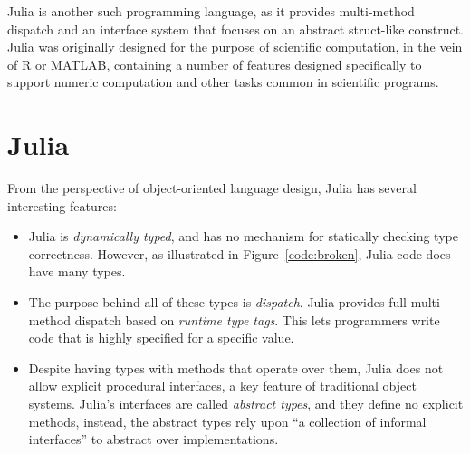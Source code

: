 \documentclass[preprint]{sigplanconf}
\begin{document}
Julia is another such programming language, as it provides multi-method dispatch 
and an interface system that focuses on an abstract struct-like construct. 
Julia was originally designed for the purpose of scientific computation, in the vein of 
R or MATLAB\cite{bezan}, containing a number of features designed specifically to support 
numeric computation and other tasks common in scientific programs.


\section{Julia}

From the perspective of object-oriented language design, Julia has several 
interesting features:
\begin{itemize}
\item Julia is \emph{dynamically typed}, and has no mechanism for statically
checking type correctness. However, as illustrated in Figure~\ref{code:broken},
Julia code does have many types.
\item The purpose behind all of these types is \emph{dispatch}. Julia provides 
full multi-method dispatch based on \emph{runtime type tags}. This lets programmers
write code that is highly specified for a specific value. 
\item Despite having types with methods that operate over them, Julia does not 
allow explicit procedural interfaces, a key feature of traditional object 
systems. Julia's interfaces are called \emph{abstract types}, and they define no 
explicit methods, instead, the abstract types rely upon ``a collection of informal interfaces''
\cite{juliadocu} to abstract over implementations. 
\end{itemize}
\end{document}
